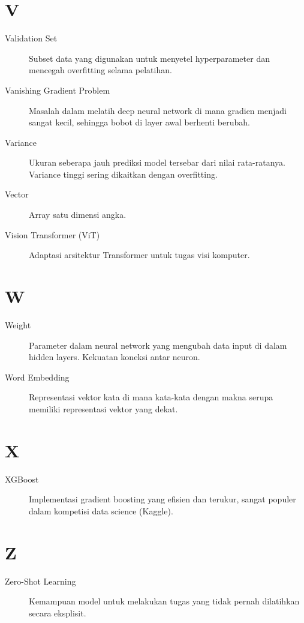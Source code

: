 \section*{V}
\begin{description}
    \item[Validation Set] Subset data yang digunakan untuk menyetel hyperparameter dan mencegah overfitting selama pelatihan.
    \item[Vanishing Gradient Problem] Masalah dalam melatih deep neural network di mana gradien menjadi sangat kecil, sehingga bobot di layer awal berhenti berubah.
    \item[Variance] Ukuran seberapa jauh prediksi model tersebar dari nilai rata-ratanya. Variance tinggi sering dikaitkan dengan overfitting.
    \item[Vector] Array satu dimensi angka.
    \item[Vision Transformer (ViT)] Adaptasi arsitektur Transformer untuk tugas visi komputer.
\end{description}

\section*{W}
\begin{description}
    \item[Weight] Parameter dalam neural network yang mengubah data input di dalam hidden layers. Kekuatan koneksi antar neuron.
    \item[Word Embedding] Representasi vektor kata di mana kata-kata dengan makna serupa memiliki representasi vektor yang dekat.
\end{description}

\section*{X}
\begin{description}
    \item[XGBoost] Implementasi gradient boosting yang efisien dan terukur, sangat populer dalam kompetisi data science (Kaggle).
\end{description}

\section*{Z}
\begin{description}
    \item[Zero-Shot Learning] Kemampuan model untuk melakukan tugas yang tidak pernah dilatihkan secara eksplisit.
\end{description}

